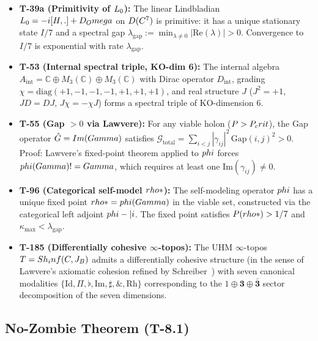 \begin{itemize}[leftmargin=2em,nosep]
  \item \textbf{T-39a  (Primitivity of $L_0$):}
        The linear Lindbladian $L_0 = -i[H,.] + D_Omega$
        on $D(C^7)$ is primitive: it has a unique stationary
        state $I/7$ and a spectral gap
        $\lambda_{\mathrm{gap}} := \min_{\lambda \neq 0}|\mathrm{Re}(\lambda)| > 0$.
        Convergence to $I/7$ is exponential with rate $\lambda_{\mathrm{gap}}$.
  \item \textbf{T-53  (Internal spectral triple, KO-dim 6):}
        The internal algebra $A_{\mathrm{int}} = \mathbb{C} \oplus M_3(\mathbb{C})
        \oplus M_3(\mathbb{C})$ with Dirac operator $D_{\mathrm{int}}$,
        grading $\chi = \mathrm{diag}(+1,-1,-1,-1,+1,+1,+1)$, and real
        structure $J$ ($J^2 = +1$, $JD = DJ$, $J\chi = -\chi J$) forms a
        spectral triple of KO-dimension 6.
  \item \textbf{T-55  (Gap $> 0$ via Lawvere):}
        For any viable holon ($P > P_crit$), the Gap operator
        $\hat{G} = Im(Gamma)$ satisfies
        $\mathcal{G}_{\mathrm{total}} = \sum_{i<j}|\gamma_{ij}|^2\,
        \mathrm{Gap}(i,j)^2 > 0$. Proof: Lawvere's fixed-point theorem
        applied to $phi$ forces $phi(Gamma) != Gamma$, which requires
        at least one $\mathrm{Im}(\gamma_{ij}) \neq 0$.
  \item \textbf{T-96  (Categorical self-model $rho*$):}
        The self-modeling operator $phi$ has a unique fixed point
        $rho* = phi(Gamma)$ in the viable set, constructed via the
        categorical left adjoint $phi -| i$. The fixed point satisfies
        $P(rho*) > 1/7$ and $\kappa_{\max} < \lambda_{\mathrm{gap}}$.
  \item \textbf{T-185  (Differentially cohesive $\infty$-topos):}
        The UHM $\infty$-topos $T = Sh_inf(C, J_B)$ admits
        a differentially cohesive structure (in the sense of Lawvere's axiomatic
        cohesion refined by Schreiber~\cite{schreiber2013}) with seven canonical
        modalities $\{\mathrm{Id}, \Pi, \flat, \mathrm{Im}, \sharp, \&, \mathrm{Rh}\}$
        corresponding to the $1 \oplus \mathbf{3} \oplus \bar{\mathbf{3}}$
        sector decomposition of the seven dimensions.
\end{itemize}

\subsection{No-Zombie Theorem (T-8.1)}
\label{subsec:no-zombie}

